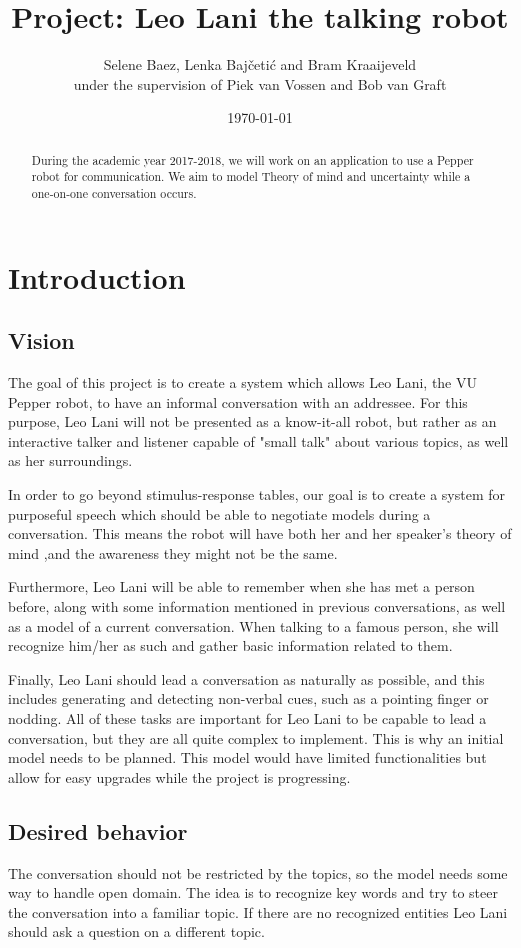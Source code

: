 \documentclass[a4paper]{article}
\title{Project: Leo Lani the talking robot}
\author{Selene Baez, Lenka Bajčetić and Bram Kraaijeveld \\
under the supervision of Piek van Vossen and Bob van Graft}
\date{\today}
\begin{document}
\maketitle

\begin{abstract}
During the academic year 2017-2018, we will work on an application to use a Pepper robot for communication. We aim to model Theory of mind and uncertainty while a one-on-one conversation occurs.
\end{abstract}

\newpage
\tableofcontents

\newpage
\section{Introduction}
\subsection{Vision}
\label{sec:vision}
The goal of this project is to create a system which allows Leo Lani, the VU Pepper robot, to have an informal conversation with an addressee. For this purpose, Leo Lani will not be presented as a know-it-all robot, but rather as an interactive talker and listener capable of "small talk" about various topics, as well as her surroundings. 

In order to go beyond stimulus-response tables, our goal is to create a system for purposeful speech which should be able to negotiate models during a conversation. This means the robot will have both her and her speaker's theory of mind ,and the awareness they might not be the same. 

Furthermore, Leo Lani will be able to remember when she has met a person before, along with some information mentioned in previous conversations, as well as a model of a current conversation. When talking to a famous person, she will recognize him/her as such and gather basic information related to them. 

Finally, Leo Lani should lead a conversation as naturally as possible, and this includes generating and detecting non-verbal cues, such as a pointing finger or nodding. All of these tasks are important for Leo Lani to be capable to lead a conversation, but they are all quite complex to implement. This is why an initial model needs to be planned. This model would have limited functionalities but allow for easy upgrades while the project is progressing. 

\subsection{Desired behavior}
The conversation should not be restricted by the topics, so the model needs some way to handle open domain. The idea is to recognize key words and try to steer the conversation into a familiar topic. If there are no recognized entities Leo Lani should ask a question on a different topic.
\end{document}
